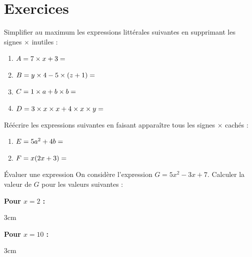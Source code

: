 \documentclass[a4paper]{book}
\begin{document}
\section{Exercices}
    \begin{exercice}
        Simplifier au maximum les expressions littérales suivantes en supprimant les signes $\times$ inutiles :
        \begin{enumerate}[label=\alph*)]
            \item $A = 7 \times x + 3 = \dotfill$
            \item $B = y \times 4 - 5 \times (z + 1) = \dotfill$
            \item $C = 1 \times a + b \times b = \dotfill$
            \item $D = 3 \times x \times x + 4 \times x \times y = \dotfill$
        \end{enumerate}
    \end{exercice}
    
    \begin{exercice}
        Réécrire les expressions suivantes en faisant apparaître tous les signes $\times$ cachés :
        \begin{enumerate}[label=\alph*)]
            \item $E = 5a^2 + 4b = \dotfill$
            \item $F = x(2x + 3) = \dotfill$
        \end{enumerate}
    \end{exercice}
    
    \begin{exerciceTitre}{Évaluer une expression}
        On considère l'expression $G = 5x^2 - 3x + 7$.
        Calculer la valeur de $G$ pour les valeurs suivantes :
        
        \medskip
        \begin{minipage}{0.48\linewidth}
            \textbf{Pour $x = 2$ :}
            \begin{ZoneReponse}{3cm}\end{ZoneReponse}
        \end{minipage}
        \hfill
        \begin{minipage}{0.48\linewidth}
            \textbf{Pour $x = 10$ :}
            \begin{ZoneReponse}{3cm}\end{ZoneReponse}
        \end{minipage}
    \end{exerciceTitre}
    
\end{document}
